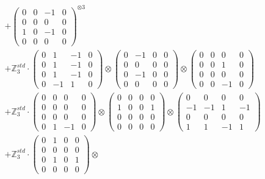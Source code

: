 \documentclass{article}
\begin{document}
{\begin{align}
        &+ \label{Rs16-Rc11-Solution-10-c16} \begin{pmatrix} 0 & 0 & -1 & 0 \\ 0 & 0 & 0 & 0 \\ 1 & 0 & -1 & 0 \\ 0 & 0 & 0 & 0 \end{pmatrix}^{\otimes 3} \\
        &+ \label{Rs16-Rc11-Solution-10-c17} \mathbb{Z}_3^{std} \cdot 
            \begin{pmatrix} 0 & 1 & -1 & 0 \\ 0 & 1 & -1 & 0 \\ 0 & 1 & -1 & 0 \\ 0 & -1 & 1 & 0 \end{pmatrix} \otimes 
            \begin{pmatrix} 0 & -1 & 0 & 0 \\ 0 & 0 & 0 & 0 \\ 0 & -1 & 0 & 0 \\ 0 & 0 & 0 & 0 \end{pmatrix} \otimes 
            \begin{pmatrix} 0 & 0 & 0 & 0 \\ 0 & 0 & 1 & 0 \\ 0 & 0 & 0 & 0 \\ 0 & 0 & -1 & 0 \end{pmatrix} \\ 
        &+ \label{Rs16-Rc11-Solution-10-c18} \mathbb{Z}_3^{std} \cdot 
            \begin{pmatrix} 0 & 0 & 0 & 0 \\ 0 & 0 & 0 & 0 \\ 0 & 0 & 0 & 0 \\ 0 & 1 & -1 & 0 \end{pmatrix} \otimes 
            \begin{pmatrix} 0 & 0 & 0 & 0 \\ 1 & 0 & 0 & 1 \\ 0 & 0 & 0 & 0 \\ 0 & 0 & 0 & 0 \end{pmatrix} \otimes 
            \begin{pmatrix} 0 & 0 & 0 & 0 \\ -1 & -1 & 1 & -1 \\ 0 & 0 & 0 & 0 \\ 1 & 1 & -1 & 1 \end{pmatrix} \\ 
        &+ \label{Rs16-Rc11-Solution-10-c19} \mathbb{Z}_3^{std} \cdot 
            \begin{pmatrix} 0 & 1 & 0 & 0 \\ 0 & 0 & 0 & 0 \\ 0 & 1 & 0 & 1 \\ 0 & 0 & 0 & 0 \end{pmatrix} \otimes 

\end{align}}
\end{document}
